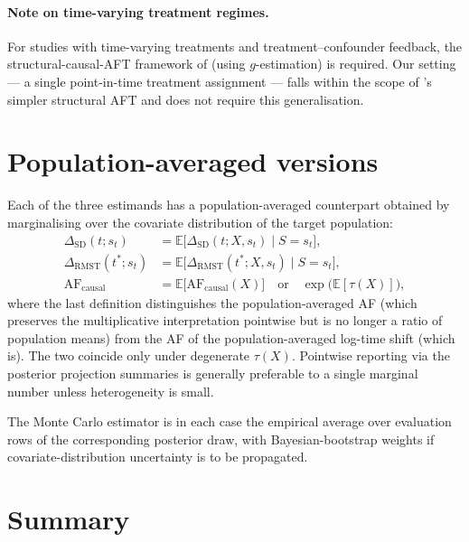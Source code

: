 \documentclass[11pt]{article}
\newcommand{\X}{X}
\newcommand{\Sx}{S}
\newcommand{\tauf}{\tau}
\newcommand{\RMST}{\mathrm{RMST}}
\newcommand{\SD}{\mathrm{SD}}
\newcommand{\AF}{\mathrm{AF}}
\begin{document}
\paragraph{Note on time-varying treatment regimes.}
For studies with time-varying treatments and treatment--confounder
feedback, the structural-causal-AFT framework of
\citet{HernanColeStrAFT2005} (using $g$-estimation) is required. Our
setting --- a single point-in-time treatment assignment --- falls within
the scope of \citet{Brathovde2024}'s simpler structural AFT and does not
require this generalisation.

\section{Population-averaged versions}

Each of the three estimands has a population-averaged counterpart obtained
by marginalising over the covariate distribution of the target population:
\begin{align}
  \Delta_{\SD}(t; s_{t})
  &= \mathbb{E}\bigl[\Delta_{\SD}(t; \X, s_{t}) \mid \Sx = s_{t}\bigr], \\
  \Delta_{\RMST}(t^{*}; s_{t})
  &= \mathbb{E}\bigl[\Delta_{\RMST}(t^{*}; \X, s_{t}) \mid \Sx = s_{t}\bigr], \\
  \AF_{\mathrm{causal}}
  &= \mathbb{E}\bigl[\AF_{\mathrm{causal}}(\X)\bigr]
   \quad \text{or} \quad
   \exp\bigl(\mathbb{E}[\tauf(\X)]\bigr),
\end{align}
where the last definition distinguishes the population-averaged AF (which
preserves the multiplicative interpretation pointwise but is no longer a
ratio of population means) from the AF of the population-averaged log-time
shift (which is). The two coincide only under degenerate $\tauf(\X)$.
Pointwise reporting via the posterior projection summaries is generally
preferable to a single marginal number unless heterogeneity is small.

The Monte Carlo estimator is in each case the empirical average over
evaluation rows of the corresponding posterior draw, with Bayesian-bootstrap
weights if covariate-distribution uncertainty is to be propagated.

\section{Summary}
\end{document}
